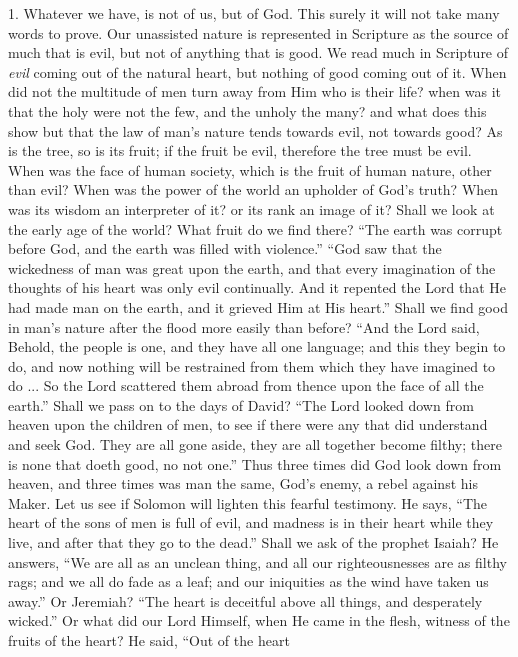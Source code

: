 1. Whatever we have, is not of us, but of God. This surely it will
not take many words to prove. Our unassisted nature is represented in
Scripture as the source of much that is evil, but not of anything that
is good. We read much in Scripture of \emph{evil} coming out of the
natural heart, but nothing of good coming out of it. When did not the
multitude of men turn away from Him who is their life? when was it
that the holy were not the few, and the unholy the many? and what does
this show but that the law of man's nature tends towards evil, not
towards good? As is the tree, so is its fruit; if the fruit be evil,
therefore the tree must be evil. When was the face of human society,
which is the fruit of human nature, other than evil? When was the
power of the world an upholder of God's truth? When was its wisdom an
interpreter of it? or its rank an image of it? Shall we look at the
early age of the world? What fruit do we find there? ``The earth
was corrupt before God, and the earth was filled with violence.''
``God saw that the wickedness of man was great upon the earth, and
that every imagination of the thoughts of his heart was only evil
continually. And it repented the Lord that He had made man on the
earth, and it grieved Him at His heart.'' Shall we find good in
man's nature after the flood more easily than before? ``And the
Lord said, Behold, the people is one, and they have all one language;
and this they begin to do, and now nothing will be restrained from
them which they have imagined to do ... So the Lord scattered them
abroad from thence upon the face of all the earth.'' Shall we pass
on to the days of David? ``The Lord looked down from heaven upon
the children of men, to see if there were any that did understand and
seek God. They are all gone aside, they are all together become
filthy; there is none that doeth good, no not one.'' Thus three
times did God look down from heaven, and three times was man the same,
God's enemy, a rebel against his Maker. Let us see if Solomon will
lighten this fearful testimony. He says, ``The heart of the sons
of men is full of evil, and madness is in their heart while they live,
and after that they go to the dead.'' Shall we ask of the prophet
Isaiah? He answers, ``We are all as an unclean thing, and all our
righteousnesses are as filthy rags; and we all do fade as a leaf; and
our iniquities as the wind have taken us away.'' Or Jeremiah?
``The heart is deceitful above all things, and desperately
wicked.'' Or what did our Lord Himself, when He came in the flesh,
witness of the fruits of the heart? He said, ``Out of the heart
